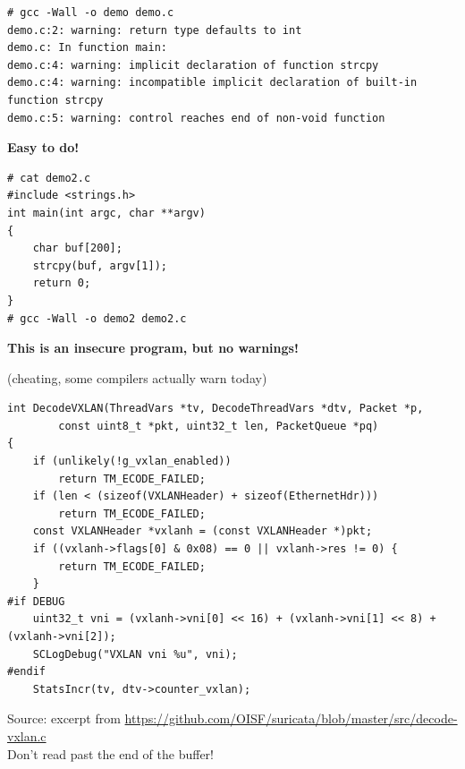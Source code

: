 \documentclass[Screen16to9,17pt]{foils}
\begin{document}
\begin{verbatim}
# gcc -Wall -o demo demo.c
demo.c:2: warning: return type defaults to int
demo.c: In function main:
demo.c:4: warning: implicit declaration of function strcpy
demo.c:4: warning: incompatible implicit declaration of built-in
function strcpy
demo.c:5: warning: control reaches end of non-void function
\end{verbatim}

\vskip 15mm
\centerline{\bf\LARGE\color{security6blue}Easy to do!}


\begin{verbatim}
# cat demo2.c
#include <strings.h>
int main(int argc, char **argv)
{
    char buf[200];
    strcpy(buf, argv[1]);
    return 0;
}
# gcc -Wall -o demo2 demo2.c
\end{verbatim}

\vskip 1cm
\centerline{\bf\large\color{security6blue}This is an insecure program, but no warnings!}

(cheating, some compilers actually warn today)




\begin{verbatim}
int DecodeVXLAN(ThreadVars *tv, DecodeThreadVars *dtv, Packet *p,
        const uint8_t *pkt, uint32_t len, PacketQueue *pq)
{
    if (unlikely(!g_vxlan_enabled))
        return TM_ECODE_FAILED;
    if (len < (sizeof(VXLANHeader) + sizeof(EthernetHdr)))
        return TM_ECODE_FAILED;
    const VXLANHeader *vxlanh = (const VXLANHeader *)pkt;
    if ((vxlanh->flags[0] & 0x08) == 0 || vxlanh->res != 0) {
        return TM_ECODE_FAILED;
    }
#if DEBUG
    uint32_t vni = (vxlanh->vni[0] << 16) + (vxlanh->vni[1] << 8) + (vxlanh->vni[2]);
    SCLogDebug("VXLAN vni %u", vni);
#endif
    StatsIncr(tv, dtv->counter_vxlan);
\end{verbatim}

Source: excerpt from \url{https://github.com/OISF/suricata/blob/master/src/decode-vxlan.c}\\
Don't read past the end of the buffer!



\end{document}
